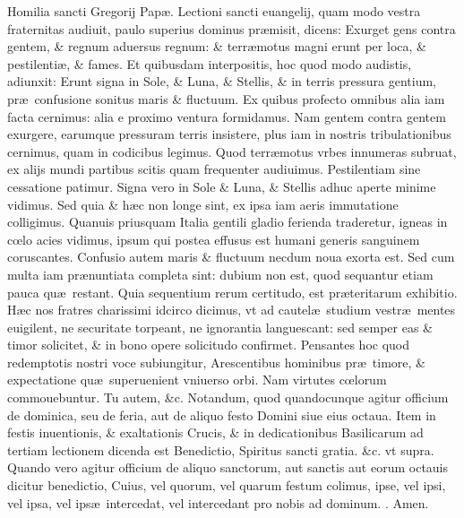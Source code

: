 \documentclass[a5paper,10pt]{book}
\makeatletter
\DeclareRobustCommand{\Rbar}{\vers@resp{0pt}{R}}
\newcommand{\vers@resp@sym}{\raisebox{0.2ex}{\rotatebox[origin=c]{-20}{$\m@th\rceil$}}}
\newcommand{\vers@resp}[2]{%
  {\ooalign{\hidewidth\kern#1\vers@resp@sym\hidewidth\cr#2\cr}}%
}%
\def\ae{æ}
\def\oe{œ}
\makeatother
\begin{document}
\begin{multicols*}{2}
\newline \color{red} Homilia sancti Gregorij Pap\ae . \color{black}
\newline \color{red} L\color{black}ectioni sancti euangelij, quam modo vestra fraternitas audiuit, paulo superius dominus pr\ae misit, dicens:
Exurget gens contra gentem, \& regnum aduersus regnum: \& terr\ae motus magni erunt per loca, \& pestilenti\ae , \& fames. 
Et quibusdam interpositis, hoc quod modo audistis, adiunxit: Erunt signa in Sole, \& Luna, \& Stellis, \& in terris pressura gentium, pr\ae \ confusione sonitus maris \& fluctuum.
Ex quibus profecto omnibus alia iam facta cernimus: alia e proximo ventura formidamus.
Nam gentem contra gentem exurgere, earumque pressuram terris insistere, plus iam in nostris tribulationibus cernimus, quam in codicibus legimus.
Quod terr\ae motus vrbes innumeras subruat, ex alijs mundi partibus scitis quam frequenter audiuimus.
Pestilentiam sine cessatione patimur.
Signa vero in Sole \& Luna, \& Stellis adhuc aperte minime vidimus.
Sed quia \& h\ae c non longe sint, ex ipsa iam aeris immutatione colligimus.
Quanuis priusquam Italia gentili gladio ferienda traderetur, igneas in c\oe lo acies vidimus, ipsum qui postea effusus est humani generis sanguinem coruscantes.
Confusio autem maris \& fluctuum necdum noua exorta est.
Sed cum multa iam pr\ae nuntiata completa sint: dubium non est, quod sequantur etiam pauca qu\ae \ restant.
Quia sequentium rerum certitudo, est pr\ae teritarum exhibitio.
H\ae c nos fratres charissimi idcirco dicimus, vt ad cautel\ae \ studium vestr\ae \ mentes euigilent, ne securitate torpeant, ne ignorantia languescant: sed semper eas \& timor solicitet, \& in bono opere solicitudo confirmet.
Pensantes hoc quod redemptotis nostri voce subiungitur, Arescentibus hominibus pr\ae \ timore, \& expectatione qu\ae \ superuenient vniuerso orbi.
Nam virtutes c\oe lorum commouebuntur.
Tu autem, \&c.
\newline {} \color{red} Notandum, quod quandocunque agitur officium de dominica, seu de feria, aut de aliquo festo Domini siue eius octaua. \color{black}
\newline {} \color{red} Item in festis inuentionis, \& exaltationis Crucis, \& in dedicationibus Basilicarum ad tertiam lectionem dicenda est Benedictio, \color{black} Spiritus sancti gratia. \color{red} \&c. vt supra. Quando vero agitur officium de aliquo sanctorum, aut sanctis aut eorum octauis dicitur benedictio, \color{black} Cuius, \color{red} vel \color{black} quorum, \color{red} vel \color{black} quarum festum colimus, ipse, \color{red} vel \color{black} ipsi, \color{red} vel \color{black} ipsa, \color{red} vel \color{black} ips\ae \ intercedat, \color{red} vel \color{black} intercedant pro nobis ad dominum. \color{red} \Rbar . \color{black} Amen.

\end{multicols*}
\end{document}
